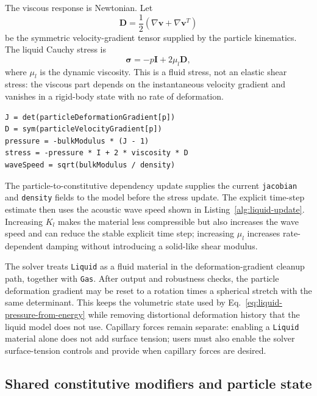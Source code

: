 The viscous response is Newtonian.  Let
\begin{equation}
  \mathbf{D}=\frac{1}{2}\left(\nabla\mathbf{v}+\nabla\mathbf{v}^{T}\right)
  \label{eq:liquid-rate-of-deformation}
\end{equation}
be the symmetric velocity-gradient tensor supplied by the particle kinematics.  The liquid Cauchy stress is
\begin{equation}
  \boldsymbol{\sigma}=-p\mathbf{I}+2\mu_l\mathbf{D},
  \label{eq:liquid-stress}
\end{equation}
where \(\mu_l\) is the dynamic viscosity.  This is a fluid stress, not an elastic shear stress: the viscous part depends on the instantaneous velocity gradient and vanishes in a rigid-body state with no rate of deformation.

\begin{lstlisting}[caption={Liquid stress update.},label={alg:liquid-update},basicstyle=\ttfamily\small]
J = det(particleDeformationGradient[p])
D = sym(particleVelocityGradient[p])
pressure = -bulkModulus * (J - 1)
stress = -pressure * I + 2 * viscosity * D
waveSpeed = sqrt(bulkModulus / density)
\end{lstlisting}

The particle-to-constitutive dependency update supplies the current \texttt{jacobian} and \texttt{density} fields to the model before the stress update.  The explicit time-step estimate then uses the acoustic wave speed shown in Listing~\ref{alg:liquid-update}.  Increasing \(K_l\) makes the material less compressible but also increases the wave speed and can reduce the stable explicit time step; increasing \(\mu_l\) increases rate-dependent damping without introducing a solid-like shear modulus.

The solver treats \texttt{Liquid} as a fluid material in the deformation-gradient cleanup path, together with \texttt{Gas}.  After output and robustness checks, the particle deformation gradient may be reset to a rotation times a spherical stretch with the same determinant.  This keeps the volumetric state used by Eq.~\eqref{eq:liquid-pressure-from-energy} while removing distortional deformation history that the liquid model does not use.  Capillary forces remain separate: enabling a \texttt{Liquid} material alone does not add surface tension; users must also enable the solver surface-tension controls and provide  when capillary forces are desired.

\subsection{Shared constitutive modifiers and particle state}
\label{subsec:constitutive-modifiers}

